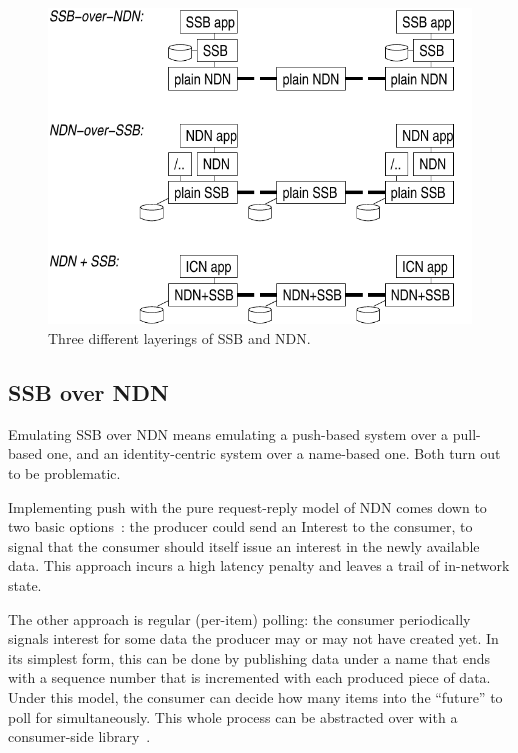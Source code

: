\documentclass[9pt,sigconf]{acmart}
\begin{document}
\begin{figure}[htb]
  \raggedright
  \includegraphics[width=0.9\columnwidth]{figs/ssb-and-ndn.pdf}
  \caption{Three different layerings of SSB and NDN.}
  \label{fig:ssb-and-ndn}
\end{figure}

\subsection{SSB over NDN}
\label{ssect:ssb-over-ndn}

Emulating SSB over NDN means emulating a push-based system over a
pull-based one, and an identity-centric system over a name-based
one. Both turn out to be problematic.

Implementing push with the pure request-reply model of NDN comes down
to two basic options~\cite{carzaniga2011pubsub}: the producer could
send an Interest to the consumer, to signal that the consumer should
itself issue an interest in the newly available data. This approach
incurs a high latency penalty and leaves a trail of in-network state.

The other approach is regular (per-item) polling: the consumer
periodically signals interest for some data the producer may or may
not have created yet. In its simplest form, this can be done by
publishing data under a name that ends with a sequence number that is
incremented with each produced piece of data. Under this model, the
consumer can decide how many items into the ``future'' to poll for
simultaneously. This whole process can be abstracted over with a
consumer-side
library~\cite{moiseenko2014consumer,sardara2018transport}.
\end{document}

